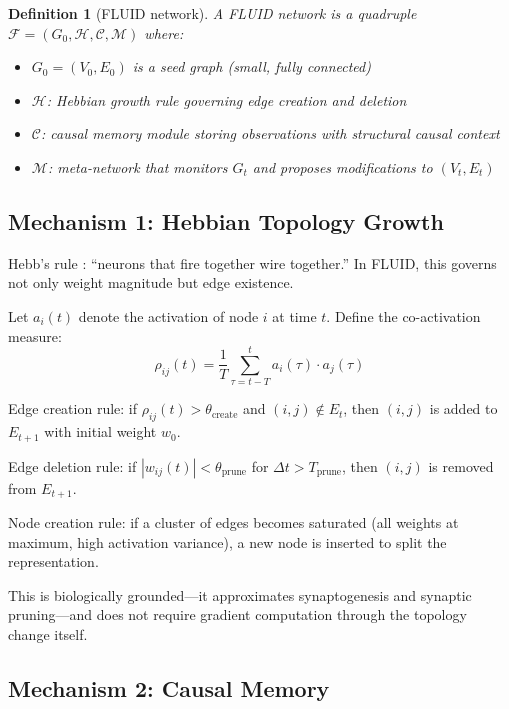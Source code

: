 \documentclass[12pt]{article}
\newtheorem{definition}{Definition}
\begin{document}
\begin{definition}[FLUID network]
A FLUID network is a quadruple $\mathcal{F} = (G_0, \mathcal{H}, \mathcal{C}, \mathcal{M})$ where:
\begin{itemize}
    \item $G_0 = (V_0, E_0)$ is a seed graph (small, fully connected)
    \item $\mathcal{H}$: Hebbian growth rule governing edge creation and deletion
    \item $\mathcal{C}$: causal memory module storing observations with structural causal context
    \item $\mathcal{M}$: meta-network that monitors $G_t$ and proposes modifications to $(V_t, E_t)$
\end{itemize}
\end{definition}

\subsection{Mechanism 1: Hebbian Topology Growth}

Hebb's rule \cite{hebb1949}: ``neurons that fire together wire together.'' In FLUID, this governs not only weight magnitude but edge existence.

Let $a_i(t)$ denote the activation of node $i$ at time $t$. Define the co-activation measure:
\begin{equation}
\rho_{ij}(t) = \frac{1}{T} \sum_{\tau=t-T}^{t} a_i(\tau) \cdot a_j(\tau)
\end{equation}

Edge creation rule: if $\rho_{ij}(t) > \theta_{\text{create}}$ and $(i,j) \notin E_t$, then $(i,j)$ is added to $E_{t+1}$ with initial weight $w_0$.

Edge deletion rule: if $|w_{ij}(t)| < \theta_{\text{prune}}$ for $\Delta t > T_{\text{prune}}$, then $(i,j)$ is removed from $E_{t+1}$.

Node creation rule: if a cluster of edges becomes saturated (all weights at maximum, high activation variance), a new node is inserted to split the representation.

This is biologically grounded---it approximates synaptogenesis and synaptic pruning---and does not require gradient computation through the topology change itself.

\subsection{Mechanism 2: Causal Memory}
\end{document}
